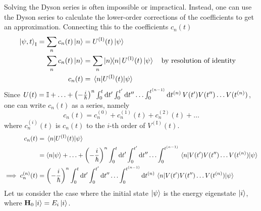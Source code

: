 \documentclass[12pt,a4paper,titlepage]{article}
\newcommand{\trm}[1]{\textrm{#1}} %
\begin{document}
Solving the Dyson series is often impossible or impractical. Instead, one can use the Dyson series to calculate the lower-order corrections of the coefficients to get an approximation. Connecting this to the coefficients $c_{n}(t)$
\begin{equation}
\begin{aligned}
\ket{\psi,t}_{\trm{I}}=\sum_{n}c_{n}(t)\ket{n}&=U^{(\trm{I})}(t)\ket{\psi}\\
\sum_{n}c_{n}(t)\ket{n}&=\sum_{n}\op{n}U^{(\trm{I})}(t)\ket{\psi}\qq{by resolution of identity}\\
c_{n}(t)&=\mel{n}{U^{(\trm{I})}(t)}{\psi}
\end{aligned}
\end{equation}
Since $U(t)=\mathbb{I}+\ldots+\qty(-\frac{i}{\hbar})^{n}\int_{0}^{t}\dd{t'}\int_{0}^{t'}\dd{t''}\ldots\int_{0}^{t^{(n-1)}}\dd{t^{(n)}}V(t')V(t'')\ldots V(t^{(n)})$, one can write $c_{n}(t)$ as a series, namely
\begin{equation}
c_{n}(t)=c_{n}^{(0)}+c_{n}^{(1)}(t)+c_{n}^{(2)}(t)+\ldots
\end{equation}
where $c_{n}^{(i)}(t)$ is $c_{n}(t)$ to the $i$-th order of $V^{(\trm{I})}(t)$.
\begin{equation}
\begin{aligned}
c_{n}(t)&=\mel{n}{U^{(\trm{I})}(t)}{\psi}\\
&=\ip{n}{\psi}+\ldots+\qty(-\frac{i}{\hbar})^{n}\int_{0}^{t}\dd{t'}\int_{0}^{t'}\dd{t''}\ldots\int_{0}^{t^{(n-1)}}\mel{n}{V(t')V(t'')\ldots V(t^{(n)})}{\psi}\\
\implies c_{n}^{(n)}(t)&=\qty(-\frac{i}{\hbar})^{n}\int_{0}^{t}\dd{t'}\int_{0}^{t'}\dd{t''}\ldots\int_{0}^{t^{(n-1)}}\dd{t^{(n)}}\mel{n}{V(t')V(t'')\ldots V(t^{(n)})}{\psi}
\end{aligned}
\end{equation}
Let us consider the case where the initial state $\ket{\psi}$ is the energy eigenstate $\ket{i}$, where $\vb{H}_{0}\ket{i}=E_{i}\ket{i}$.
\end{document}
